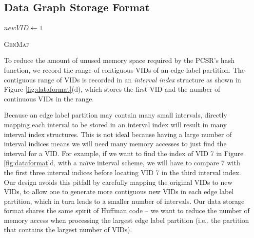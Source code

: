\subsection{\SystemName Data Graph Storage Format}
\begin{algorithm}[t!]
$newVID \leftarrow 1$\;
\caption{\textsc{GenMap}}
\label{algo:genmap}
\end{algorithm}


To reduce the amount of unused memory space required by the PCSR's hash function, we record the range of contiguous VIDs of an edge label
partition. The contiguous range of VIDs is recorded in an \emph{interval index} structure as shown in Figure \ref{fig:dataformat}(d), which
stores the first VID and the number of continuous VIDs in the range.

Because an edge label partition may contain many small intervals, directly mapping each interval to be stored in an interval index will
result in many interval index structures. This is not ideal because having a large number of interval indices means we will need many
memory accesses to just find the interval for a VID. For example, if we want to find the index of VID 7 in Figure \ref{fig:dataformat}d,
with a naïve interval scheme, we will have to compare 7 with the first three interval indices before locating VID 7 in the third interval
index. Our design avoids this pitfall by carefully mapping the original VIDs to new VIDs, to allow one to generate more contiguous new VIDs
in each edge label partition, which in turn leads to a smaller number of intervals. Our data storage format shares the same spirit of
Huffman code – we want to reduce the number of memory access when processing the largest edge label partition (i.e., the partition that
contains the largest number of VIDs).

